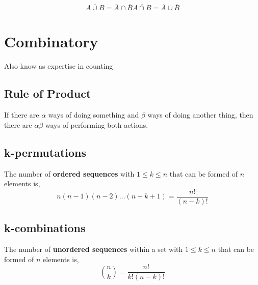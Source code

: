 
\begin{gather*}
   \overline{A \cup B} = \overline{A} \cap \overline{B}
   \overline{A \cap B} = \overline{A} \cup \overline{B}
\end{gather*}

\section{Combinatory} %
\label{sec:combinatory}

Also know as expertise in counting

\subsection{Rule of Product} %
\label{sub:rule_of_product}

If there are $\alpha$ ways of doing something and $\beta$ ways of doing another
thing, then there are $\alpha\beta$ ways of performing both actions.

\subsection{k-permutations} %
\label{sub:k_permutations}


The number of \textbf{ordered sequences} with $1\leq k \leq n$ that can be
formed of $n$ elements is,
\begin{equation*}
n(n-1)(n-2)\dots(n-k+1) = \dfrac{n!}{(n-k)!}
\end{equation*}

\subsection{k-combinations} %
\label{sub:k_combinations}


The number of \textbf{unordered sequences} within a set with $1\leq k \leq n$
that can be formed of $n$ elements is,
\begin{equation*}
\binom{n}{k} = \dfrac{n!}{k!(n-k)!}
\end{equation*}

